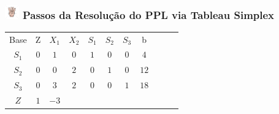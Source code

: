 \begin{frame}
	\frametitle{\includegraphics[width=0.6cm,height=0.6cm]{number_4.jpg} \hspace{0.2cm} Passos da Resolução do PPL via Tableau Simplex}

	{		
		\begin{table}		
			\begin{tabular}{c c c c c c c c c c c}
				\cline{1-8} 
				\cellcolor{blue!100} \color{white} \scriptsize Base 
				&\cellcolor{blue!100} \color{white} \scriptsize Z 
				&\cellcolor{blue!100} \color{white} $\scriptstyle X_1$ 
				&\cellcolor{blue!100} \color{white} $\scriptstyle X_2$ 
				&\cellcolor{blue!100} \color{red} $\scriptstyle S_1$ 
				&\cellcolor{blue!100} \color{red} $\scriptstyle S_2$ 
				&\cellcolor{blue!100} \color{red} $\scriptstyle S_3$ 
				&\cellcolor{blue!100} \color{white} \scriptsize b
				&
				&
				& \\
				\cline{1-8}
				\cellcolor{blue!100} \color{red} $\scriptstyle S_1$
				& \cellcolor{yellow!50} $\scriptstyle 0$
				& \cellcolor{yellow!50} $\scriptstyle 1$
				& \cellcolor{yellow!50} $\scriptstyle 0$
				& \cellcolor{yellow!50} $\scriptstyle 1$
				& \cellcolor{yellow!50} $\scriptstyle 0$
				& \cellcolor{yellow!50} $\scriptstyle 0$
				& \cellcolor{yellow!50} $\scriptstyle 4$
				&
				&
				& \\
				\cline{1-8} 
			    \cellcolor{blue!100} \color{red} $\scriptstyle S_2$
				& \cellcolor{yellow!50} $\scriptstyle 0$
				& \cellcolor{yellow!50} $\scriptstyle 0$
				& \cellcolor{yellow!50} $\scriptstyle 2$
				& \cellcolor{yellow!50} $\scriptstyle 0$			
				& \cellcolor{yellow!50} $\scriptstyle 1$
				& \cellcolor{yellow!50} $\scriptstyle 0$
				& \cellcolor{yellow!50} $\scriptstyle 12$
				&
				&
				& \\
				\cline{1-8} 
				\cellcolor{blue!100} \color{red} $\scriptstyle S_3$
				& \cellcolor{yellow!50} $\scriptstyle 0$
				& \cellcolor{yellow!50} $\scriptstyle 3$
				& \cellcolor{yellow!50} $\scriptstyle 2$
				& \cellcolor{yellow!50} $\scriptstyle 0$
				& \cellcolor{yellow!50} $\scriptstyle 0$
				& \cellcolor{yellow!50} $\scriptstyle 1$
				& \cellcolor{yellow!50} $\scriptstyle 18$
				&
				&
				& \\
				\cline{1-8}
				\cellcolor{blue!100} \color{white} $\scriptstyle Z$
				& \cellcolor{yellow!50} $\scriptstyle 1$
				& \cellcolor{yellow!50} $\scriptstyle -3$

\end{tabular}
\end{table}}
\end{frame}
